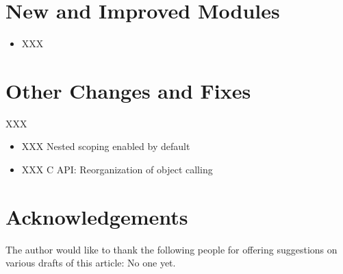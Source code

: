 \documentclass{howto}
\begin{document}
\section{New and Improved Modules}

\begin{itemize}

  \item XXX

\end{itemize}


\section{Other Changes and Fixes}

XXX

\begin{itemize}

  \item XXX Nested scoping enabled by default

  \item XXX C API: Reorganization of object calling 

 
 
 

\end{itemize}



\section{Acknowledgements}

The author would like to thank the following people for offering
suggestions on various drafts of this article: No one yet.
\end{document}
